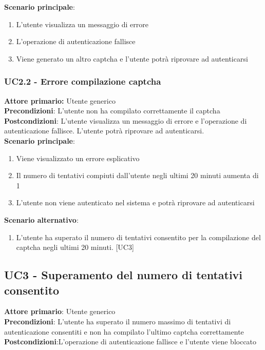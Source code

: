 \textbf{Scenario principale}:
\begin{enumerate}
	\item L’utente visualizza un messaggio di errore
	\item L’operazione di autenticazione fallisce
	\item Viene generato un altro captcha e l’utente potrà riprovare ad autenticarsi
\end{enumerate}

\subsubsection{UC2.2 - Errore compilazione captcha}
\textbf{Attore primario:} Utente generico\\
\textbf{Precondizioni}: L’utente non ha compilato correttamente il captcha\\
\textbf{Postcondizioni}:  L’utente visualizza un messaggio di errore e l’operazione di autenticazione fallisce. L’utente potrà riprovare  ad autenticarsi.\\

\textbf{Scenario principale}:
\begin{enumerate}
	\item Viene visualizzato un errore esplicativo
	\item Il numero di tentativi compiuti dall’utente negli ultimi 20 minuti aumenta di 1
	\item L’utente non viene autenticato nel sistema e potrà  riprovare ad autenticarsi
\end{enumerate}

\textbf{Scenario alternativo}:
\begin{enumerate}
	\item L’utente ha superato il numero di tentativi consentito per la compilazione del captcha negli ultimi 20 minuti. [UC3]
\end{enumerate}


\subsection{UC3 - Superamento del numero di tentativi consentito}
\textbf{Attore primario}: Utente generico\\
\textbf{Precondizioni}: L'utente ha superato il numero massimo di tentativi di autenticazione consentiti e non ha compilato l'ultimo captcha correttamente\\
\textbf{Postcondizioni}:L'operazione di autenticazione fallisce e l'utente viene bloccato\\

